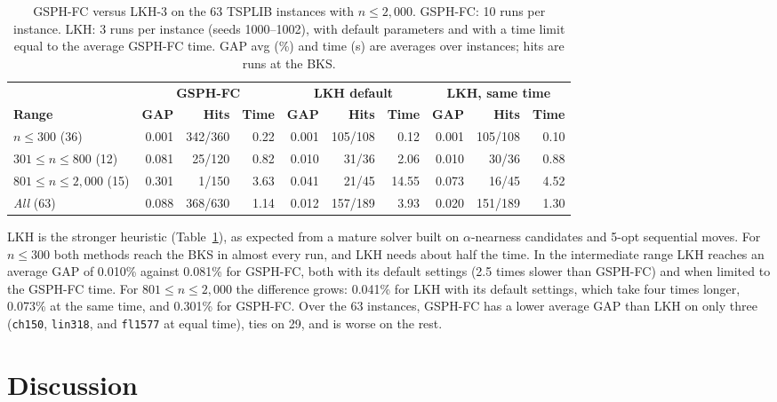 \documentclass[runningheads]{llncs}
\begin{document}
\begin{table}
\caption{GSPH-FC versus LKH-3 on the 63 TSPLIB instances with
$n\le 2{,}000$. GSPH-FC: 10 runs per instance. LKH: 3 runs per instance
(seeds 1000--1002), with default parameters and with a time limit equal
to the average GSPH-FC time. GAP avg (\%) and time (s) are averages over
instances; hits are runs at the BKS.}
\label{tab:lkh}
\centering\scriptsize
\begin{tabular}{@{}lrrrrrrrrr@{}}
\toprule
& \multicolumn{3}{c}{\textbf{GSPH-FC}} & \multicolumn{3}{c}{\textbf{LKH default}} & \multicolumn{3}{c}{\textbf{LKH, same time}}\\
\cmidrule(lr){2-4}\cmidrule(lr){5-7}\cmidrule(lr){8-10}
\textbf{Range} & \textbf{GAP} & \textbf{Hits} & \textbf{Time} & \textbf{GAP} & \textbf{Hits} & \textbf{Time} & \textbf{GAP} & \textbf{Hits} & \textbf{Time}\\
\midrule
$n\le 300$ (36)           & 0.001 & 342/360 & 0.22 & 0.001 & 105/108 &  0.12 & 0.001 & 105/108 & 0.10 \\
$301\le n\le 800$ (12)    & 0.081 &  25/120 & 0.82 & 0.010 &  31/36  &  2.06 & 0.010 &  30/36  & 0.88 \\
$801\le n\le 2{,}000$ (15)& 0.301 &   1/150 & 3.63 & 0.041 &  21/45  & 14.55 & 0.073 &  16/45  & 4.52 \\
\midrule
\textit{All} (63)         & 0.088 & 368/630 & 1.14 & 0.012 & 157/189 &  3.93 & 0.020 & 151/189 & 1.30 \\
\bottomrule
\end{tabular}
\end{table}

LKH is the stronger heuristic (Table~\ref{tab:lkh}), as expected from a
mature solver built on $\alpha$-nearness candidates and 5-opt sequential
moves. For $n\le 300$ both methods reach the BKS in almost every run,
and LKH needs about half the time. In the intermediate range LKH reaches
an average GAP of 0.010\% against 0.081\% for GSPH-FC, both with its
default settings (2.5 times slower than GSPH-FC) and when limited to the
GSPH-FC time. For $801\le n\le 2{,}000$ the difference grows: 0.041\%
for LKH with its default settings, which take four times longer,
0.073\% at the same time, and 0.301\% for GSPH-FC. Over the 63
instances, GSPH-FC has a lower average GAP than LKH on only three
(\texttt{ch150}, \texttt{lin318}, and \texttt{fl1577} at equal time),
ties on 29, and is worse on the rest.

\section{Discussion}
\label{sec:discussion}
\end{document}
